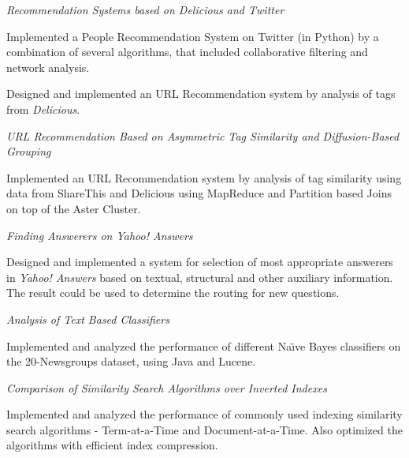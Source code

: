 \documentclass[10pt]{article}
\newcommand{\spc}{\vspace{1.2mm}}
\begin{document}
\textit{Recommendation Systems based on Delicious and Twitter} 
\begin{compactitem}
\item {Implemented a People Recommendation System on Twitter (in Python) by a combination of several algorithms, that included collaborative filtering and network analysis.}
\item{Designed and implemented an URL Recommendation system by analysis of tags from \emph{Delicious}.}
\end{compactitem}
\spc
\textit{URL Recommendation Based on Asymmetric Tag Similarity and Diffusion-Based Grouping}
\begin{compactitem}
\item {Implemented an URL Recommendation system by analysis of tag similarity using data from ShareThis and Delicious using MapReduce and Partition based Joins on top of the Aster Cluster.}
\end{compactitem}
\spc

\textit{Finding Answerers on Yahoo! Answers}
\begin{compactitem}
\item {Designed and implemented a system for selection of most appropriate answerers in \emph{Yahoo! Answers} based on textual, structural and other auxiliary information. The result could be used to determine the routing for new questions.}
\end{compactitem}
\spc

\textit{Analysis of Text Based Classifiers}
\begin{compactitem}
\item {Implemented and analyzed the performance of different Na\"{\i}ve Bayes classifiers on the 20-Newsgroups dataset, using Java and Lucene.}
\end{compactitem}
\spc

\textit{Comparison of Similarity Search Algorithms over Inverted Indexes}
\begin{compactitem}
\item {Implemented and analyzed the performance of commonly used indexing similarity search algorithms - Term-at-a-Time and Document-at-a-Time. Also optimized the algorithms  with efficient index compression.}
\end{compactitem}
\spc
\end{document}
